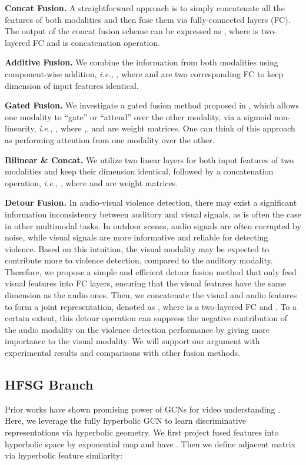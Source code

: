 \documentclass[sigconf]{acmart}
\newcommand{\ie}{{\emph{i.e., }}}
\begin{document}
\noindent\textbf{Concat Fusion.}
A straightforward approach is to simply concatenate all the features of both modalities and then fuse them via fully-connected layers (FC). The output  of the concat fusion scheme can be expressed as , where  is two-layered FC and  is concatenation operation.

\noindent\textbf{Additive Fusion.}
We combine the information from both modalities using component-wise addition, \ie , where  and  are two corresponding FC to keep dimension of input features identical.  

\noindent\textbf{Gated Fusion.}
We investigate a gated fusion method proposed in \cite{kiela2018efficient}, which allows one modality to “gate” or “attend” over the other modality, via a sigmoid non-linearity, \ie , where ,, and  are weight matrices. One can think of this approach as performing attention from one modality over the other. 

\noindent\textbf{Bilinear \& Concat.}
We utilize two linear layers for both input features of two modalities and keep their dimension identical, followed by a concatenation operation, \ie , where  and  are weight matrices.

\noindent\textbf{Detour Fusion.}
In audio-visual violence detection, there may exist a significant information inconsistency between auditory and visual signals, as is often the case in other multimodal tasks.  In outdoor scenes, audio signals are often corrupted by noise, while visual signals are more informative and reliable for detecting violence. Based on this intuition, the visual modality may be expected to contribute more to violence detection, compared to the auditory modality. Therefore, we propose a simple and efficient detour fusion method that only feed visual features into FC layers, ensuring that the visual features have the same dimension as the audio ones. Then, we concatenate the visual and audio features to form a joint representation, denoted as , where  is a two-layered FC and . To a certain extent, this detour operation can suppress the negative contribution of the audio modality on the violence detection performance by giving more importance to the visual modality. We will support our argument with experimental results and comparisons with other fusion methods.


\subsection{HFSG Branch}
Prior works have shown promising power of GCNs for video understanding \cite{Wang_Gupta_2018, c:3, Zeng_Huang_Tan_Rong_Zhao_Huang_Gan_2019, c:2}. Here, we leverage the fully hyperbolic GCN to learn discriminative representations via hyperbolic geometry. We first project fused features  into hyperbolic space by exponential map  and have . Then we define adjacent matrix  via hyperbolic feature similarity:
\end{document}
